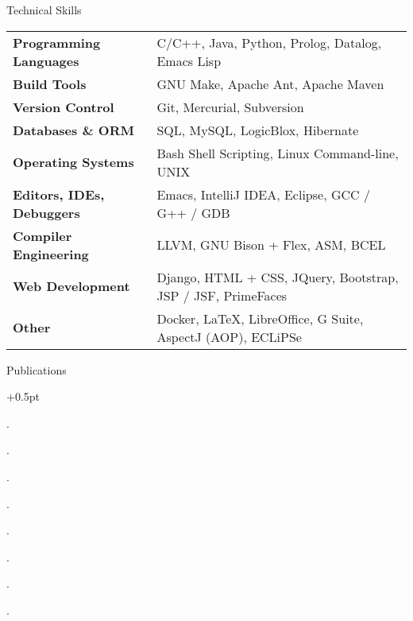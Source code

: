 \documentclass{resume}
\begin{document}
\begin{rSection}{Technical Skills}

{\renewcommand{\arraystretch}{1.3}
\begin{tabular}{ @{} >{\bfseries}l @{\hspace{6ex}} l }

Programming Languages
   & C/C++, Java, Python, Prolog, Datalog, Emacs Lisp \\

Build Tools
   & GNU Make, Apache Ant, Apache Maven \\

Version Control
   & Git, Mercurial, Subversion \\

Databases \& ORM
   & SQL, MySQL, LogicBlox, Hibernate \\

Operating Systems
   & Bash Shell Scripting, Linux Command-line, UNIX \\

Editors, IDEs, Debuggers
   & Emacs, IntelliJ IDEA, Eclipse, GCC / G++ / GDB \\

Compiler Engineering
   & LLVM, GNU Bison + Flex, ASM, BCEL \\


Web Development
   & Django, HTML + CSS, JQuery, Bootstrap, JSP / JSF, PrimeFaces \\

Other
   & Docker, \LaTeX{}, LibreOffice, G Suite, AspectJ (AOP), ECLiPSe \\
\end{tabular}}
\end{rSection}


\begin{rSection}{Publications}
  \begin{rSubsection}{}{}{}{}
    \itemsep +0.5pt %
  \item {}.
  \item {}.
  \item {}.
  \item {}.
  \item {}.
  \item {}.
  \item {}.
  \item {}.
  \end{rSubsection}
\end{rSection}
\end{document}
